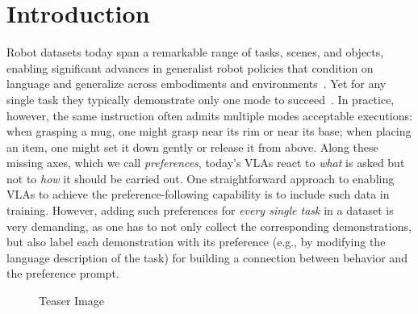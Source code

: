 \documentclass{article}
\begin{document}


\section{Introduction}

Robot datasets today span a remarkable range of tasks, scenes, and objects, enabling significant advances in generalist robot policies that condition on language and generalize across embodiments and environments~\cite{o2024open}. Yet for any single task they typically demonstrate only one mode to succeed~\citep{libero, liberoplus}.
In practice, however, the same instruction often admits multiple modes acceptable executions: when grasping a mug, one might grasp near its rim or near its base; when placing an item, one might set it down gently or release it from above.
Along these missing axes, which we call \emph{preferences}, today's VLAs react to \emph{what} is asked but not to \emph{how} it should be carried out. One straightforward approach to enabling VLAs to achieve the preference-following capability is to include such data in training.
However, adding such preferences for \emph{every single task} in a dataset is very demanding, as one has to not only collect the corresponding demonstrations, but also label each demonstration with its preference (e.g., by modifying the language description of the task) for building a connection between behavior and the preference prompt.


\begin{figure}[t]
  \centering
  \caption{Teaser Image}
  \label{fig:real_overlay}
\end{figure}
\end{document}
